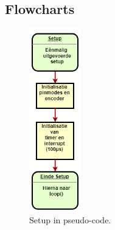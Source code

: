 \documentclass[a4paper,dutch]{article}
\begin{document}
\begin{appendices}
\section{Flowcharts}
\label{appendix:flowchart}
\begin{figure}[H]
\centering
\includegraphics[width=0.2\textwidth]{Setup.png}
\caption{\label{fig:setup}Setup in pseudo-code.}
\end{figure}


\end{appendices}
\end{document}
